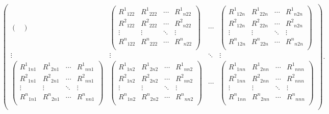 \documentclass[11pt]{article}
\begin{document}
\[\begin{pmatrix}
\begin{pmatrix}
\end{pmatrix} & \begin{pmatrix}
{R^{1}}_{122} & {R^{1}}_{222} & \cdots & {R^{1}}_{n22} \\ 
{R^{2}}_{122} & {R^{2}}_{222} & \cdots & {R^{2}}_{n22} \\ 
 \vdots & \vdots & \ddots &\vdots \\ 
{R^{n}}_{122} & {R^{n}}_{222} & \cdots & {R^{n}}_{n22} \\ 
\end{pmatrix} & \cdots & \begin{pmatrix}
{R^{1}}_{12n} & {R^{1}}_{22n} & \cdots & {R^{1}}_{n2n} \\ 
{R^{2}}_{12n} & {R^{2}}_{22n} & \cdots & {R^{2}}_{n2n} \\ 
 \vdots & \vdots & \ddots &\vdots \\ 
{R^{n}}_{12n} & {R^{n}}_{22n} & \cdots & {R^{n}}_{n2n} \\ 
\end{pmatrix} \\ 
 \vdots & \vdots & \ddots &\vdots \\ 
\begin{pmatrix}
{R^{1}}_{1n1} & {R^{1}}_{2n1} & \cdots & {R^{1}}_{nn1} \\ 
{R^{2}}_{1n1} & {R^{2}}_{2n1} & \cdots & {R^{2}}_{nn1} \\ 
 \vdots & \vdots & \ddots &\vdots \\ 
{R^{n}}_{1n1} & {R^{n}}_{2n1} & \cdots & {R^{n}}_{nn1} \\ 
\end{pmatrix} & \begin{pmatrix}
{R^{1}}_{1n2} & {R^{1}}_{2n2} & \cdots & {R^{1}}_{nn2} \\ 
{R^{2}}_{1n2} & {R^{2}}_{2n2} & \cdots & {R^{2}}_{nn2} \\ 
 \vdots & \vdots & \ddots &\vdots \\ 
{R^{n}}_{1n2} & {R^{n}}_{2n2} & \cdots & {R^{n}}_{nn2} \\ 
\end{pmatrix} & \cdots & \begin{pmatrix}
{R^{1}}_{1nn} & {R^{1}}_{2nn} & \cdots & {R^{1}}_{nnn} \\ 
{R^{2}}_{1nn} & {R^{2}}_{2nn} & \cdots & {R^{2}}_{nnn} \\ 
 \vdots & \vdots & \ddots &\vdots \\ 
{R^{n}}_{1nn} & {R^{n}}_{2nn} & \cdots & {R^{n}}_{nnn} \\ 
\end{pmatrix} \\ 
\end{pmatrix}.
\]
\end{document}
